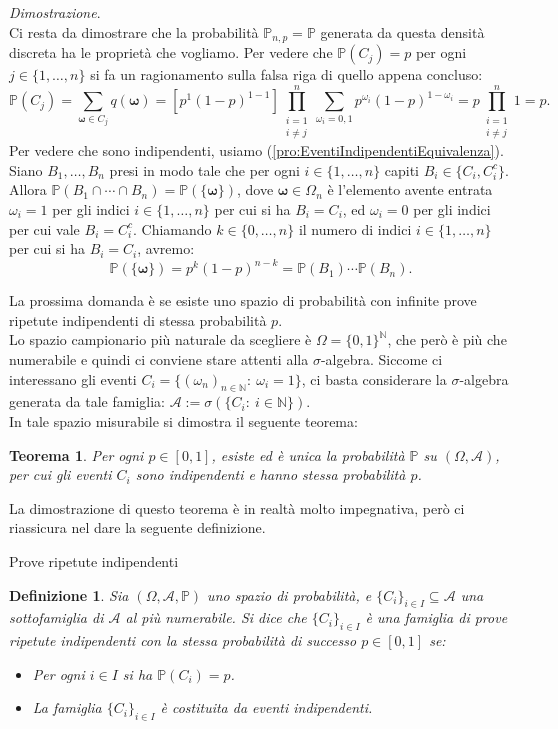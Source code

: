 \documentclass[11pt]{book}
\makeatletter
\theoremstyle{Definizione}
\newtheorem*{mydef}{Definizione}
\theoremstyle{TeoremaProposizioneLemmaCorollario}
\newtheorem{myteo}{Teorema}[section]
\theoremstyle{OsservazioneNota}
\renewenvironment{proof}[1][\proofname]{\par
  \normalfont \topsep6\p@\@plus6\p@\relax
  \trivlist
  \item[\hskip\labelsep
        \itshape
    #1\@addpunct{.}]\ignorespaces
}{%
  \endtrivlist\@endpefalse
}
\newcommand{\N}{\mathbb{N}}
\newcommand{\mybold}[1]{\boldsymbol{#1}}
\renewcommand{\P}{\mathbb{P}}
\renewenvironment{proof}{\textsl{Dimostrazione}.}{}
\makeatother
\begin{document}
\begin{boxteo}{}
\begin{proof}
$$$$
Ci resta da dimostrare che la probabilità $\P_{n,p} = \P$ generata da questa densità discreta ha le proprietà che vogliamo. Per vedere che $\P(C_j) = p$ per ogni $j\in \{1,\dots,n\}$ si fa un ragionamento sulla falsa riga di quello appena concluso:
$$
\P(C_j) = \sum_{\mybold{\omega}\in C_j} q(\mybold{\omega}) = [p^1(1-p)^{1-1}]\prod_{\substack{i = 1 \\ i\neq j}}^n \sum_{\omega_i = 0,1} p^{\omega_i}(1-p)^{1-\omega_i} = p \prod_{\substack{i = 1 \\ i\neq j}}^n 1 = p.
$$
Per vedere che sono indipendenti, usiamo (\ref{pro:EventiIndipendentiEquivalenza}). Siano $B_1,\dots,B_n$ presi in modo tale che per ogni $i\in \{1,\dots,n\}$ capiti $B_i \in \{C_i,C_i^c\}$. Allora $\P(B_1\cap \cdots \cap B_n) = \P(\{\mybold{\omega}\})$, dove $\mybold{\omega}\in \Omega_n$ è l'elemento avente entrata $\omega_i = 1$ per gli indici $i\in \{1,\dots,n\}$ per cui si ha $B_i = C_i$, ed $\omega_i = 0$ per gli indici per cui vale $B_i = C_i^c$. Chiamando $k\in\{0,\dots,n\}$ il numero di indici $i\in \{1,\dots,n\}$ per cui si ha $B_i = C_i$, avremo:
$$
\P(\{\mybold{\omega}\}) = p^k(1-p)^{n-k} = \P(B_1)\cdots\P(B_n).
$$
\end{proof}
\end{boxteo}
\noindent
La prossima domanda è se esiste uno spazio di probabilità con infinite prove ripetute indipendenti di stessa probabilità $p$.\\
Lo spazio campionario più naturale da scegliere è $\Omega = \{0,1\}^{\N}$, che però è più che numerabile e quindi ci conviene stare attenti alla $\sigma$-algebra. Siccome ci interessano gli eventi $C_i = \{(\omega_n)_{n\in\N}:\ \omega_i = 1\}$, ci basta considerare la $\sigma$-algebra generata da tale famiglia: $\mathcal{A}:= \sigma(\{C_i:\ i\in \N\})$.\\
In tale spazio misurabile si dimostra il seguente teorema:
\begin{boxteo}{}
\begin{myteo}
Per ogni $p\in [0,1]$, esiste ed è unica la probabilità $\P$ su $(\Omega,\mathcal{A})$, per cui gli eventi $C_i$ sono indipendenti e hanno stessa probabilità $p$.
\end{myteo}
\end{boxteo}
\noindent
La dimostrazione di questo teorema è in realtà molto impegnativa, però ci riassicura nel dare la seguente definizione.
\begin{boxdef}{Prove ripetute indipendenti}
\begin{mydef}
Sia $(\Omega,\mathcal{A},\P)$ uno spazio di probabilità, e $\{C_i\}_{i\in I}\subseteq \mathcal{A}$ una sottofamiglia di $\mathcal{A}$ al più numerabile. Si dice che $\{C_i\}_{i\in I}$ è una famiglia di prove ripetute indipendenti con la stessa probabilità di successo $p\in [0,1]$ se:
\begin{itemize}
\item Per ogni $i\in I$ si ha $\P(C_i) = p$.
\item La famiglia $\{C_i\}_{i\in I}$ è costituita da eventi indipendenti.
\end{itemize}
\end{mydef}
\end{boxdef}
\end{document}
